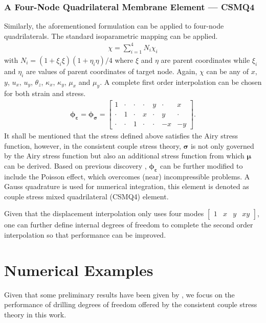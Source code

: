 \documentclass[3p,sort&compress,11pt,fleqn]{elsarticle}
\begin{document}
\subsubsection{A Four-Node Quadrilateral Membrane Element --- CSMQ4}
Similarly, the aforementioned formulation can be applied to four-node quadrilaterals. The standard isoparametric mapping can be applied.
\begin{gather}
\chi=\sum_{i=1}^4N_i\chi_i
\end{gather}
with $N_i=\left(1+\xi_i\xi\right)\left(1+\eta_i\eta\right)/4$ where $\xi$ and $\eta$ are parent coordinates while $\xi_i$ and $\eta_i$ are values of parent coordinates of target node. Again, $\chi$ can be any of $x$, $y$, $u_x$, $u_y$, $\theta_z$, $\kappa_x$, $\kappa_y$, $\mu_x$ and $\mu_y$. A complete first order interpolation can be chosen for both strain and stress.
\begin{gather}
\mathbold{\phi}_\mathbold{\varepsilon}=\mathbold{\phi}_\mathbold{\sigma}=\begin{bmatrix}
1&\cdot&\cdot&\cdot&y&\cdot&x\\\cdot&1&\cdot&x&\cdot&y&\cdot\\\cdot&\cdot&1&\cdot&\cdot&-x&-y
\end{bmatrix}.
\end{gather}
It shall be mentioned that the stress defined above satisfies the Airy stress function, however, in the consistent couple stress theory, $\mathbold{\sigma}$ is not only governed by the Airy stress function but also an additional stress function \citep{Hadjesfandiari2011} from which $\mathbold{\mu}$ can be derived. Based on previous discovery \citep{Chang2019}, $\mathbold{\phi}_\mathbold{\varepsilon}$ can be further modified to include the Poisson effect, which overcomes (near) incompressible problems. A  Gauss quadrature is used for numerical integration, this element is denoted as couple stress mixed quadrilateral (CSMQ4) element.

Given that the displacement interpolation only uses four modes $\begin{bmatrix}
1&x&y&xy
\end{bmatrix}$, one can further define internal degrees of freedom to complete the second order interpolation so that performance can be improved.
\section{Numerical Examples}
Given that some preliminary results have been given by \citet{Darrall2013,Pedgaonkar2021}, we focus on the performance of drilling degrees of freedom offered by the consistent couple stress theory in this work.
\end{document}
